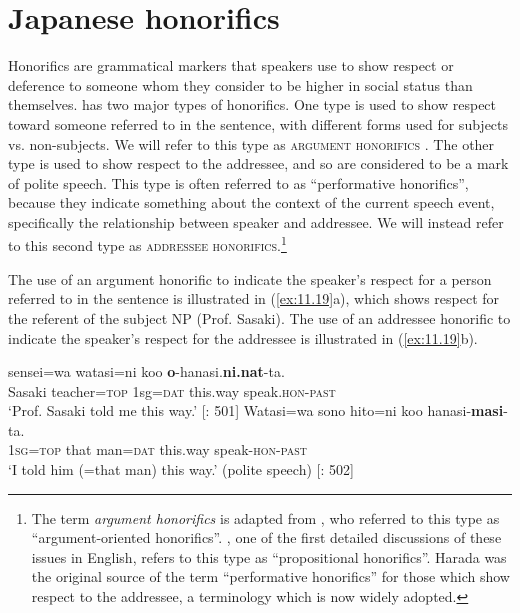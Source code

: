 \section{Japanese honorifics}\label{sec:11.3}

Honorifics are grammatical markers that speakers use to show respect or deference to someone whom they consider to be higher in social status than themselves.  has two major types of honorifics. One type is used to show respect toward someone referred to in the sentence, with different forms used for subjects vs. non-subjects. We will refer to this type as \textsc{argument honorifics} . The other type is used to show respect to the addressee, and so are considered to be a mark of polite speech. This type is often referred to as “performative honorifics”, because they indicate something about the context of the current speech event, specifically the relationship between speaker and addressee. We will instead refer to this second type as \textsc{addressee honorifics}.\footnote{The term \textit{argument honorifics} is adapted from \citet{Potts2005}, who referred to this type as “argument-oriented honorifics”. \citet{Harada1976}, one of the first detailed discussions of these issues in English, refers to this type as “propositional honorifics”. Harada was the original source of the term “performative honorifics” for those which show respect to the addressee, a terminology which is now widely adopted.}


The use of an argument honorific to indicate the speaker’s respect for a person referred to in the sentence is illustrated in (\ref{ex:11.19}a), which shows respect for the referent of the subject NP (Prof. {Sasaki}). The use of an addressee honorific to indicate the speaker’s respect for the addressee is illustrated in (\ref{ex:11.19}b).


\ea \label{ex:11.19}
\ea   {}  sensei=wa  watasi=ni  koo  \textbf{o}-hanasi.\textbf{ni.nat}-ta.\\
{Sasaki}  teacher=\textsc{top}  1sg=\textsc{dat}  this.way  speak.\textsc{hon-past}\\
\glt ‘Prof. {Sasaki} told me this way.’  [\citealt{Harada1976}: 501]
\ex \gll
    Watasi=wa  sono  hito=ni  koo  hanasi-\textbf{masi}-ta.\\
\textsc{1sg}=\textsc{top}  that  man=\textsc{dat}  this.way  speak-\textsc{hon-past}\\
\glt ‘I told him (=that man) this way.’  (polite speech)   [\citealt{Harada1976}: 502]
\z \z


